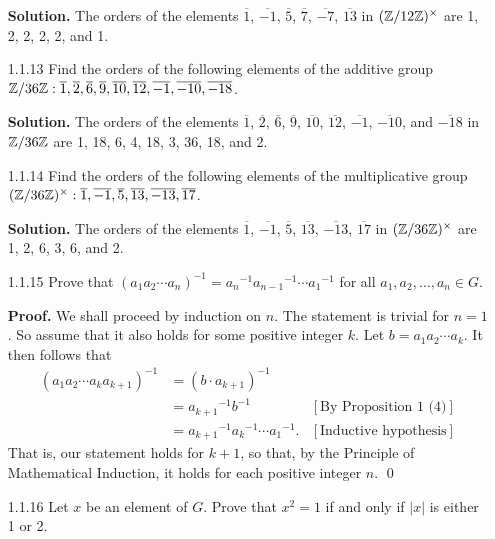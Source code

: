 \begin{enumerate}
      \textbf{Solution.} The orders of the elements $\overline{1}$,
      $\overline{-1}$, $\overline{5}$, $\overline{7}$, $\overline{-7}$,
      $\overline{13}$ in $(\mathbb{Z}/12\mathbb{Z})^\times$ are 1, 2, 2, 2, 2, and 1.
   \item[1.1.13]  Find the orders of the following elements of the additive
                  group $\mathbb{Z}/36\mathbb{Z}: \overline{1}, \overline{2}, \overline{6}, 
                  \overline{9}, \overline{10}, \overline{12}, \overline{-1}, 
                  \overline{-10}, \overline{-18}$.
                  
      \textbf{Solution.} The orders of the elements $\overline{1}$,
      $\overline{2}$, $\overline{6}$, $\overline{9}$, $\overline{10}$,
      $\overline{12}$, $\overline{-1}$, $\overline{-10}$, and $\overline{-18}$
      in $\mathbb{Z}/36\mathbb{Z}$ are 1, 18, 6, 4, 18, 3, 36, 18, and 2.
   \item[1.1.14]  Find the orders of the following elements of the
                  multiplicative group $(\mathbb{Z}/36\mathbb{Z})^\times: \overline{1},
                  \overline{-1}, \overline{5}, \overline{13}, \overline{-13},
                  \overline{17}$.
                  
      \textbf{Solution.} The orders of the elements $\overline{1}$,
      $\overline{-1}$, $\overline{5}$, $\overline{13}$, $\overline{-13}$,
      $\overline{17}$ in $(\mathbb{Z}/36\mathbb{Z})^\times$ are 1, 2, 6, 3, 6, and 2.
   \item[1.1.15]  Prove that $(a_1a_2\cdots a_n)^{-1} =
                  {a_n}^{-1}{a_{n-1}}^{-1}\cdots {a_1}^{-1}$ for all
                  $a_1, a_2, \ldots, a_n \in G$.
                  
      \textbf{Proof.} We shall proceed by induction on $n$. The statement is
      trivial for $n = 1$. So assume that it also holds for some positive
      integer $k$. Let $b = a_1a_2\cdots a_k$. It then follows that
      \begin{align*}
         (a_1a_2\cdots a_ka_{k+1})^{-1} &= (b \cdot a_{k+1})^{-1} \\
            &= {a_{k+1}}^{-1}b^{-1} &[\text{By Proposition 1 (4)}] \\
            &= {a_{k+1}}^{-1}{a_k}^{-1}\cdots {a_1}^{-1}.
                  &[\text{Inductive hypothesis}]
      \end{align*}
      That is, our statement holds for $k + 1$, so that, by the Principle of
      Mathematical Induction, it holds for each positive integer $n$. \qed
   \item[1.1.16]  Let $x$ be an element of $G$. Prove that $x^2 = 1$ if and only
                  if $|x|$ is either 1 or 2.
                  

\end{enumerate}
